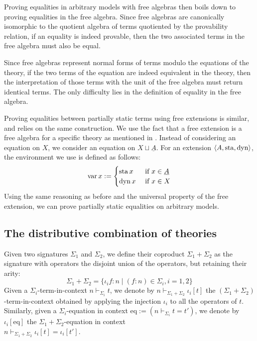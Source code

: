 Proving equalities in arbitrary models with free algebras then boils down to proving equalities in the free algebra. Since free algebras are canonically isomorphic to the quotient algebra of terms quotiented by the provability relation, if an equality is indeed provable, then the two associated terms in the free algebra must also be equal. 

Since free algebras represent normal forms of terms modulo the equations of the theory, if the two terms of the equation are indeed equivalent in the theory, then the interpretation of those terms with the unit of the free algebra must return identical terms. The only difficulty lies in the definition of equality in the free algebra.

Proving equalities between partially static terms using free extensions is similar, and relies on the same construction. We use the fact that a free extension is a free algebra for a specific theory as mentioned in . Instead of considering an equation on $X$, we consider an equation on $X \sqcup \underline{A}$. For an extension $\left\langle A, \operatorname{sta}, \operatorname{dyn} \right\rangle$, the environment we use is defined as follows: $$\operatorname{var} x := \begin{cases}
  \operatorname{sta} x &\text{ if $x \in \underline{A}$}\\
  \operatorname{dyn} x &\text{ if $x \in X$}
\end{cases}$$ Using the same reasoning as before and the universal property of the free extension, we can prove partially static equalities on arbitrary models.

\subsection{The distributive combination of theories}


Given two signatures $\Sigma_1$ and $\Sigma_2$, we define their coproduct $\Sigma_1 + \Sigma_2$ as the signature with operators the disjoint union of the operators, but retaining their arity:
$$\Sigma_1 + \Sigma_2 = \{ \iota_i f : n \mid (f : n) \in \Sigma_i, i = 1, 2 \}$$
Given a $\Sigma_i$-term-in-context $ n \vdash_{\Sigma_i} t$, we denote by $n \vdash_{\Sigma_1 + \Sigma_2} \iota_i [t]$ the $(\Sigma_1 + \Sigma_2)$-term-in-context obtained by applying the injection $\iota_i$ to all the operators of $t$. Similarly, given a $\Sigma_i$-equation in context $\mathrm{eq} := (n \vdash_{\Sigma_i} t = t')$, we denote by $\iota_i [\mathrm{eq}]$ the $\Sigma_1 + \Sigma_2$-equation in context\\ $n \vdash_{\Sigma_1 + \Sigma_2} \iota_i [t] = \iota_i [t']$.

